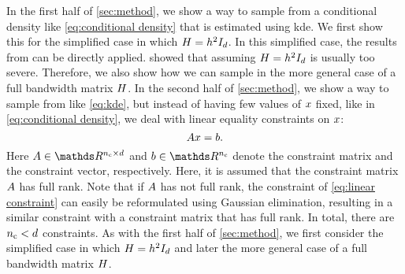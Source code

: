 In the first half of \cref{sec:method}, we show a way to sample from a conditional density like \cref{eq:conditional density} that is estimated using \ac{kde}. 
We first show this for the simplified case in which $H=h^2 I_{d}$. 
In this simplified case, the results from \textcite{hyndman1996estimating, holmes2007fast} can be directly applied.
\textcite{wand1993comparison} showed that assuming $H=h^2 I_{d}$ is usually too severe.
Therefore, we also show how we can sample in the more general case of a full bandwidth matrix $H$.
In the second half of \cref{sec:method}, we show a way to sample from  like \cref{eq:kde}, but instead of having few values of $x$ fixed, like in \cref{eq:conditional density}, we deal with linear equality constraints on $x$:
\begin{equation}
	\label{eq:linear constraint}
	A x = b.
\end{equation}
Here $\constraintmatrix \in \realnumbers^{\numberofconstraints \times \dimension}$ and $\constraintvector \in \realnumbers^{\numberofconstraints}$ denote the constraint matrix and the constraint vector, respectively. 
Here, it is assumed that the constraint matrix $A$ has full rank.
Note that if $A$ has not full rank, the constraint of \cref{eq:linear constraint} can easily be reformulated using Gaussian elimination, resulting in a similar constraint with a constraint matrix that has full rank.
In total, there are $n_\mathrm{c} < d$ constraints.
As with the first half of \cref{sec:method}, we first consider the simplified case in which $H=h^2 I_{d}$ and later the more general case of a full bandwidth matrix $H$.

